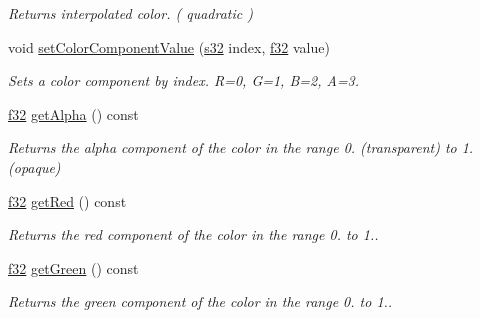 \begin{DoxyCompactItemize}
\begin{DoxyCompactList}\small\item\em Returns interpolated color. ( quadratic ) \end{DoxyCompactList}\item 
\mbox{\label{classirr_1_1video_1_1SColorf_a79c420ed7052d68d3827f455881535af}} 
void \hyperlink{classirr_1_1video_1_1SColorf_a79c420ed7052d68d3827f455881535af}{set\+Color\+Component\+Value} (\hyperlink{namespaceirr_ac66849b7a6ed16e30ebede579f9b47c6}{s32} index, \hyperlink{namespaceirr_a0277be98d67dc26ff93b1a6a1d086b07}{f32} value)
\begin{DoxyCompactList}\small\item\em Sets a color component by index. R=0, G=1, B=2, A=3. \end{DoxyCompactList}\item 
\mbox{\label{classirr_1_1video_1_1SColorf_a9dfa70dda720e7fe81853d703b174f58}} 
\hyperlink{namespaceirr_a0277be98d67dc26ff93b1a6a1d086b07}{f32} \hyperlink{classirr_1_1video_1_1SColorf_a9dfa70dda720e7fe81853d703b174f58}{get\+Alpha} () const
\begin{DoxyCompactList}\small\item\em Returns the alpha component of the color in the range 0. (transparent) to 1. (opaque) \end{DoxyCompactList}\item 
\mbox{\label{classirr_1_1video_1_1SColorf_a1d86f149d93684d94d9f85fd6dad74c5}} 
\hyperlink{namespaceirr_a0277be98d67dc26ff93b1a6a1d086b07}{f32} \hyperlink{classirr_1_1video_1_1SColorf_a1d86f149d93684d94d9f85fd6dad74c5}{get\+Red} () const
\begin{DoxyCompactList}\small\item\em Returns the red component of the color in the range 0. to 1.. \end{DoxyCompactList}\item 
\mbox{\label{classirr_1_1video_1_1SColorf_a514b2e6d07647c8270062c28569c25e2}} 
\hyperlink{namespaceirr_a0277be98d67dc26ff93b1a6a1d086b07}{f32} \hyperlink{classirr_1_1video_1_1SColorf_a514b2e6d07647c8270062c28569c25e2}{get\+Green} () const
\begin{DoxyCompactList}\small\item\em Returns the green component of the color in the range 0. to 1.. \end{DoxyCompactList}\item 

\end{DoxyCompactItemize}
